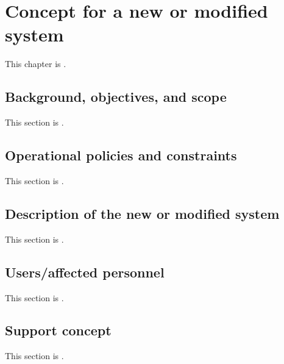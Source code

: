 
\chapter{Concept for a new or modified system}
\label{loc:Concept for a new or modified system}
% 

This chapter is \TBD.


\section{Background, objectives, and scope}
\label{loc:Background, objectives, and scope}
% 

This section is \TBD.


\section{Operational policies and constraints}
\label{loc:Operational policies and constraints}
% 

This section is \TBD.


\section{Description of the new or modified system}
\label{loc:Description of the new or modified system}
% 

This section is \TBD.


\section{Users/affected personnel}
\label{loc:Users/affected personnel}
% 

This section is \TBD.


\section{Support concept}
\label{loc:Support concept}
% 

This section is \TBD.

